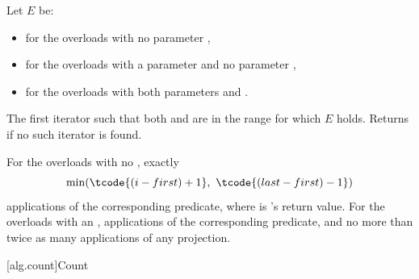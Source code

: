 \begin{itemdescr}
\pnum
Let $E$ be:
\begin{itemize}
\setlength{\emergencystretch}{1em}
\item {} for the overloads with no parameter ,
\item {} for the overloads with a parameter  and no parameter ,
\item {} for the overloads with both parameters  and .
\end{itemize}

\pnum
\returns
The first iterator 
such that both  and  are in the range 
for which $E$ holds.
Returns  if no such iterator is found.

\pnum
\complexity
For the overloads with no ,
exactly \[ \min(\tcode{(i - first) + 1}, \ \tcode{(last - first) - 1}) \]
applications of the corresponding predicate,
where  is 's return value.
For the overloads with an ,
 applications of the corresponding predicate,
and no more than twice as many applications of any projection.
\end{itemdescr}

[alg.count]{Count}

